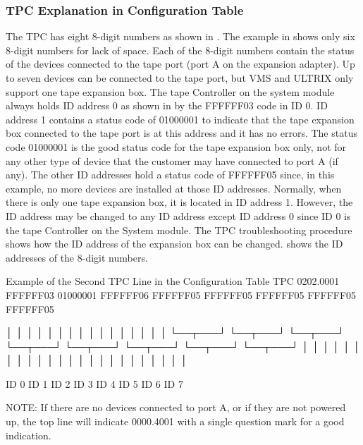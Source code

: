 \subsubsection{TPC Explanation in Configuration Table}

The TPC has eight 8-digit numbers as shown in . The example
in  shows only six 8-digit numbers for lack of space. Each of the
8-digit numbers contain the status of the devices connected to the tape port
(port A on the expansion adapter). Up to seven devices can be connected to
the tape port, but VMS and ULTRIX only support one tape expansion box.
The tape Controller on the system module always holds ID address 0 as
shown in  by the FFFFFF03 code in ID 0. ID address 1 contains
a status code of 01000001 to indicate that the tape expansion box connected
to the tape port is at this address and it has no errors. The status code
01000001 is the good status code for the tape expansion box only, not for
any other type of device that the customer may have connected to port A (if
any). The other ID addresses hold a status code of FFFFFF05 since, in this
example, no more devices are installed at those ID addresses. Normally,
when there is only one tape expansion box, it is located in ID address 1.
However, the ID address may be changed to any ID address except ID
address 0 since ID 0 is the tape Controller on the System module. The TPC
troubleshooting procedure shows how the ID address of the expansion box
can be changed.  shows the ID addresses of the 8-digit numbers.

\begin{ttfig}{Example of the Second TPC Line in the Configuration Table}
TPC        0202.0001
FFFFFF03 01000001 FFFFFF06 FFFFFF05 FFFFFF05 FFFFFF05 FFFFFF05 FFFFFF05

│      │ │      │ │      │ │      │ │      │ │      │ │      │ │      │
└──┬───┘ └──┬───┘ └──┬───┘ └──┬───┘ └──┬───┘ └──┬───┘ └──┬───┘ └──┬───┘
   │        │        │        │        │        │        │        │
   │        │        │        │        │        │        │        │
   │        │        │        │        │        │        │        │

 ID 0     ID 1     ID 2     ID 3     ID 4     ID 5     ID 6     ID 7


NOTE: If there are no devices connected to port A, or if they are not
powered up, the top line will indicate 0000.4001 with a single question
mark for a good indication.
\end{ttfig}

